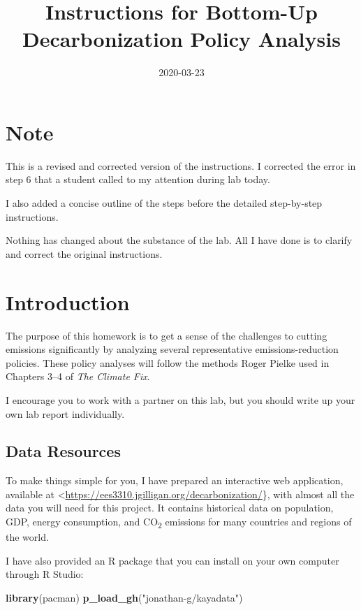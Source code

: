 \documentclass[
]{article}
\title{Instructions for Bottom-Up Decarbonization Policy Analysis}
\author{}
\date{\vspace{-2.5em}2020-03-23}
\newenvironment{Shaded}{\begin{snugshade}}{\end{snugshade}}
\newcommand{\KeywordTok}[1]{\textcolor[rgb]{0.13,0.29,0.53}{\textbf{#1}}}
\newcommand{\NormalTok}[1]{#1}
\newcommand{\StringTok}[1]{\textcolor[rgb]{0.31,0.60,0.02}{#1}}
\begin{document}
\maketitle

{
\setcounter{tocdepth}{2}
\tableofcontents
}
\hypertarget{note}{%
\section{Note}\label{note}}

This is a revised and corrected version of the instructions. I corrected
the error in step 6 that a student called to my attention during lab
today.

I also added a concise outline of the steps before the detailed
step-by-step instructions.

Nothing has changed about the substance of the lab. All I have done is
to clarify and correct the original instructions.

\hypertarget{introduction}{%
\section{Introduction}\label{introduction}}

The purpose of this homework is to get a sense of the challenges to
cutting emissions significantly by analyzing several representative
emissions-reduction policies. These policy analyses will follow the
methods Roger Pielke used in Chapters 3--4 of \emph{The Climate Fix}.

I encourage you to work with a partner on this lab, but you should write
up your own lab report individually.

\hypertarget{data-resources}{%
\subsection{Data Resources}\label{data-resources}}

To make things simple for you, I have prepared an interactive web
application, available at
\textless{}\url{https://ees3310.jgilligan.org/decarbonization/}\}, with
almost all the data you will need for this project. It contains
historical data on population, GDP, energy consumption, and
CO\textsubscript{2} emissions for many countries and regions of the
world.

I have also provided an R package that you can install on your own
computer through R Studio:

\begin{Shaded}
\begin{Highlighting}[]
\KeywordTok{library}\NormalTok{(pacman)}
\KeywordTok{p_load_gh}\NormalTok{(}\StringTok{"jonathan-g/kayadata"}\NormalTok{)}
\end{Highlighting}
\end{Shaded}
\end{document}
